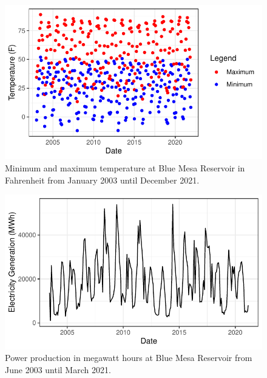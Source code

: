 \documentclass[
  12pt,
]{article}
\begin{document}
\begin{figure}

{\centering \includegraphics{Project_Report_files/figure-latex/min/max-1} 

}

\caption{Minimum and maximum temperature at Blue Mesa Reservoir in Fahrenheit from January 2003 until December 2021.}\label{fig:min/max}
\end{figure}

\begin{figure}

{\centering \includegraphics{Project_Report_files/figure-latex/power production-1} 

}

\caption{Power production in megawatt hours at Blue Mesa Reservoir from June 2003 until March 2021.}\label{fig:power production}
\end{figure}
\end{document}
